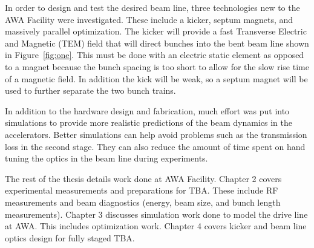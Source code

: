  \label{sec:requirements}

In order to design and test the desired beam line, three technologies 
new to the AWA Facility were investigated. These include a kicker, septum magnets, 
and massively parallel optimization.
The kicker will provide a fast Transverse Electric and Magnetic (TEM) field 
that will direct bunches into the bent beam line shown in Figure~\ref{fig:one}. 
This must be done with an electric static element as opposed to a magnet because 
the bunch spacing is too short to allow for the slow rise time of a magnetic field.
In addition the kick will be weak, so a septum magnet will be used to further
separate the two bunch trains. 

In addition to the hardware design and fabrication, much effort was put into simulations
to provide more realistic predictions of the beam dynamics in the accelerators.
Better simulations can help avoid problems such as the transmission loss in the second stage.
They can also reduce the amount of time spent on hand tuning the optics in the 
beam line during experiments.






The rest of the thesis details work done at AWA Facility.
Chapter 2 covers experimental measurements and preparations for TBA.
These include RF measurements and beam diagnostics (energy, beam size, and bunch length measurements).
Chapter 3 discusses simulation work done to model the drive line at AWA.
This includes optimization work.
Chapter 4 covers kicker and beam line optics design for fully staged TBA.

